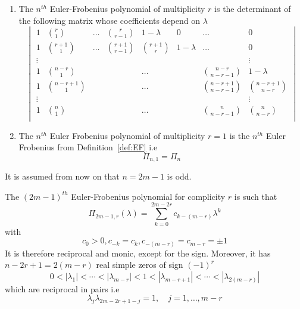 \begin{remark}
  \begin{enumerate}
    \item The $n^{th}$ Euler-Frobenius polynomial of multiplicity $r$ is the determinant of the following matrix whose 
      coefficients depend on $\lambda$ \begin{equation*}
	\begin{vmatrix} 1 & \binom{r}{1} & \hdots & \binom{r}{r-1} & 1- \lambda & 0  & \hdots &  0 \\
	  1 & \binom{r+1}{1} & \hdots & \binom{r+1}{r-1} & \binom{r+1}{r} & 1- \lambda &  \hdots & 0 \\
	  \vdots & & & & & & & \vdots \\
	  1 & \binom{n-r}{1} & & & \hdots &  & \binom{n-r}{n-r-1} &  1- \lambda  \\
	  1 & \binom{n-r+1}{1} & & & \hdots &  & \binom{n-r+1}{n-r-1} &  \binom{n-r+1}{n-r}  \\
	  \vdots & & & & & & & \vdots \\
	  1 & \binom{n}{1} & & & \hdots & & \binom{n}{n-r-1} & \binom{n}{n-r}  \\
	\end{vmatrix}
      \end{equation*}
    \item The $n^{th}$ Euler Frobenius polynomial of multiplicity $r=1$ is the $n^{th}$ Euler Frobenius from 
      Definition~\ref{def:EF} i.e
      \begin{equation*}
	\Pi_{n,1} = \Pi_n
      \end{equation*}
  \end{enumerate}
\end{remark}

It is assumed from now on that $n=2m-1$ is odd.
\begin{prop}\label{prop:EF-r}
  The $(2m-1)^{th}$ Euler-Frobenius polynomial for complicity $r$ is such that
  \begin{equation}
    \Pi_{2m-1,r}(\lambda) = \sum_{k=0}^{2m-2r}   c_{k-(m-r)}\lambda^k
  \end{equation}
  with
  \begin{equation*}
  c_0 > 0, c_{-k} = c_k, c_{-(m-r)} = c_{m-r} = \pm 1
  \end{equation*}
  It is therefore reciprocal and monic, except for the sign. Moreover, it has $n-2r+1 = 2(m-r)$ real simple zeros of 
  sign ${(-1)}^r$
  \begin{equation*}
    0 < |\lambda_1 | < \cdots < |\lambda_{m-r}| < 1 < |\lambda_{m-r+1}| < \cdots < |\lambda_{2(m-r)}|
  \end{equation*}
  which are reciprocal in pairs i.e
  \begin{equation*}
    \lambda_j \lambda_{2m-2r+1-j} = 1, \quad j=1, \ldots, m-r
  \end{equation*}
\end{prop}

